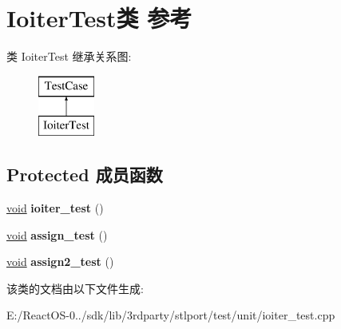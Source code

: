 \hypertarget{class_ioiter_test}{}\section{Ioiter\+Test类 参考}
\label{class_ioiter_test}
类 Ioiter\+Test 继承关系图\+:\begin{figure}[H]
\begin{center}
\leavevmode
\includegraphics[height=2.000000cm]{class_ioiter_test}
\end{center}
\end{figure}
\subsection*{Protected 成员函数}
\begin{DoxyCompactItemize}
\item 
\mbox{\label{class_ioiter_test_a021522507cb7fdd7c281d4fdbc2465f1}} 
\hyperlink{interfacevoid}{void} {\bfseries ioiter\+\_\+test} ()
\item 
\mbox{\label{class_ioiter_test_aa07ba2ace4f295b46eff6c87399c42a9}} 
\hyperlink{interfacevoid}{void} {\bfseries assign\+\_\+test} ()
\item 
\mbox{\label{class_ioiter_test_a48096d99a8690d9c30476edc8a6e88e7}} 
\hyperlink{interfacevoid}{void} {\bfseries assign2\+\_\+test} ()
\end{DoxyCompactItemize}


该类的文档由以下文件生成\+:\begin{DoxyCompactItemize}
\item 
E\+:/\+React\+O\+S-\/0../sdk/lib/3rdparty/stlport/test/unit/ioiter\+\_\+test.\+cpp\end{DoxyCompactItemize}
